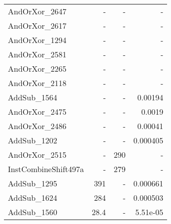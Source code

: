 \begin{tabular}{lrrr}
AndOrXor_2647 & - & - & - \\
AndOrXor_2617 & - & - & - \\
AndOrXor_1294 & - & - & - \\
AndOrXor_2581 & - & - & - \\
AndOrXor_2265 & - & - & - \\
AndOrXor_2118 & - & - & - \\
AddSub_1564 & - & - & 0.00194 \\
AndOrXor_2475 & - & - & 0.0019 \\
AndOrXor_2486 & - & - & 0.00041 \\
AddSub_1202 & - & - & 0.000405 \\
AndOrXor_2515 & - & 290 & - \\
InstCombineShift497a & - & 279 & - \\
AddSub_1295 & 391 & - & 0.000661 \\
AddSub_1624 & 284 & - & 0.000503 \\
AddSub_1560 & 28.4 & - & 5.51e-05 \\
\bottomrule
\end{tabular}
